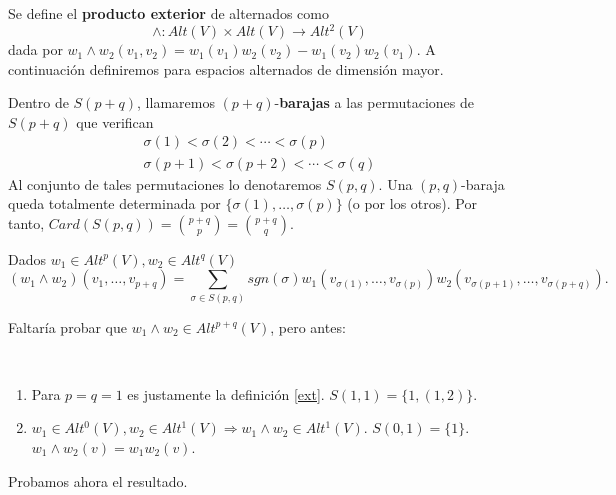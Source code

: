 \documentclass[CV.tex]{subfiles}
\begin{document}
\begin{defi}\label{ext}
Se define el \textbf{producto exterior} de alternados como 
$$\land:Alt(V)\times Alt(V)\to Alt^2(V)$$
dada por $w_1\land w_2(v_1,v_2)=w_1(v_1)w_2(v_2)-w_1(v_2)w_2(v_1)$. A continuación definiremos para espacios alternados de dimensión mayor.
\end{defi}
\begin{defi}
Dentro de $S(p+q)$, llamaremos $(p+q)$-\textbf{barajas} a las permutaciones de $S(p+q)$ que verifican
\begin{gather*}
\sigma(1)<\sigma(2)<\cdots<\sigma(p)\\
\sigma(p+1)<\sigma(p+2)<\cdots<\sigma(q)
\end{gather*}
Al conjunto de tales permutaciones lo denotaremos $S(p,q)$. Una $(p,q)$-baraja queda totalmente determinada por $\{\sigma(1),\dots, \sigma(p)\}$ (o por los otros). Por tanto, $Card(S(p,q))=\binom{p+q}{p}=\binom{p+q}{q}$.
\end{defi}
\begin{defi}
Dados $w_1\in Alt^p(V),w_2\in Alt^q(V)$
$$
(w_1\land w_2)(v_1,\dots, v_{p+q})=\sum_{\sigma\in S(p,q)} sgn(\sigma)w_1(v_{\sigma(1)},\dots, v_{\sigma(p)})w_2(v_{\sigma(p+1)},\dots, v_{\sigma(p+q)}).$$
\end{defi}
Faltaría probar que $w_1\land w_2\in Alt^{p+q}(V)$, pero antes:
\begin{nota}\
\begin{enumerate}
\item Para $p=q=1$ es justamente la definición \ref{ext}. $S(1,1)=\{1,(1,2)\}$.
\item $w_1\in Alt^0(V), w_2\in Alt^1(V)\Rightarrow w_1\land w_2\in Alt^1(V)$. $S(0,1)=\{1\}$. $w_1\land w_2(v)=w_1 w_2(v)$.
\end{enumerate}
\end{nota}
Probamos ahora el resultado. 
\end{document}
